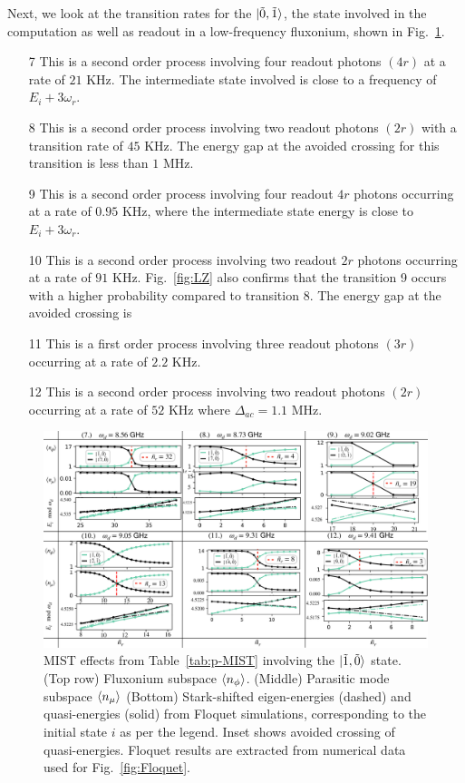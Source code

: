 \documentclass[%
reprint,
superscriptaddress,
 amsmath,amssymb,
 aps,
 prx,
longbibliography,
floatfix,
]{revtex4-2}
\begin{document}
Next, we look at the transition rates for the $\ket{\tilde{0},\tilde{1}}$, the state involved in the computation as well as readout in a low-frequency fluxonium, shown in Fig.~\ref{fig:Trans1}.
\begin{itemize}
    \item[7] This is a second order process involving four readout photons $(4r)$ at a rate of $21$ KHz. The intermediate state involved is close to a frequency of $E_i+3\omega_r$.
    \item[8] This is a second order process involving two readout photons $(2r)$ with a transition rate of $45$ KHz. The energy gap at the avoided crossing for this transition is less than $1$ MHz. 
    \item[9] This is a second order process involving four readout $4r$ photons occurring at a rate of $0.95$ KHz, where the intermediate state energy is close to $E_i+3\omega_r$. 
    \item[10] This is a second order process involving two readout $2r$ photons occurring at a rate of $91$ KHz. Fig.~\ref{fig:LZ} also confirms that the transition 9 occurs with a higher probability compared to transition 8. The energy gap at the avoided crossing is
    \item[11] This is a first order process involving three readout photons $(3r)$ occurring at a rate of $2.2$ KHz. 
    \item[12] This is a second order process involving two readout photons $(2r)$ occurring at a rate of $52$ KHz where $\Delta_{ac}=1.1$ MHz.
\end{itemize}
\begin{figure}
    \centering
    \includegraphics[width=1.0\textwidth]{Figures/Trans1.pdf}
    \caption{MIST effects from Table~\ref{tab:p-MIST} involving the $\ket{\tilde{1},\tilde{0}}$ state. (Top row) Fluxonium subspace $\braket{n_\phi}$. (Middle) Parasitic mode subspace $\braket{n_\mu}$ (Bottom) Stark-shifted eigen-energies (dashed) and quasi-energies (solid) from Floquet simulations, corresponding to the initial state $i$ as per the legend. Inset shows avoided crossing of quasi-energies. Floquet results are extracted from numerical data used for Fig.~\ref{fig:Floquet}.}
    \label{fig:Trans1}
\end{figure}
\end{document}

